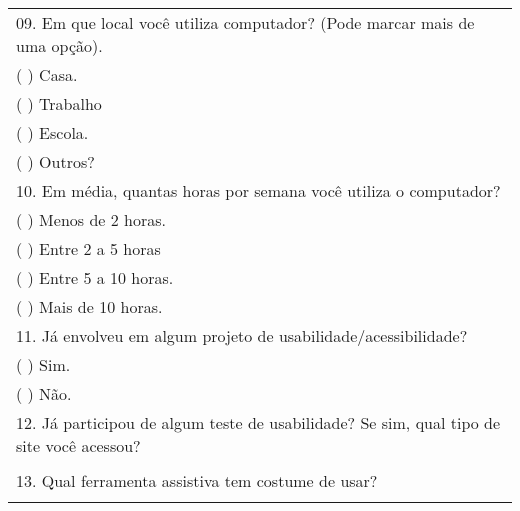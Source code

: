 \begin{center}
\begin{longtable}{l}
09. Em que local você utiliza computador? (Pode marcar mais de uma opção). \\ 
(   ) Casa. \\ 
(   ) Trabalho \\ 
(   ) Escola. \\ 
(   ) Outros? \\ 
10. Em média, quantas horas por semana você utiliza o computador? \\ 
(   ) Menos de 2 horas. \\ 
(   ) Entre 2 a 5 horas \\ 
(   ) Entre 5 a 10 horas. \\ 
(   ) Mais de 10 horas. \\ 
11. Já envolveu em algum projeto de usabilidade/acessibilidade? \\ 
(   ) Sim.\\     (   ) Não. \\ 
12. Já participou de algum teste de usabilidade? Se sim, qual tipo de site você acessou? \\ 
\hline
\multicolumn{1}{|l|}{} \\ 
\hline
13. Qual ferramenta assistiva tem costume de usar? \\ 
\hline
\multicolumn{1}{|l|}{} \\ 
\hline
\end{longtable}
\end{center}